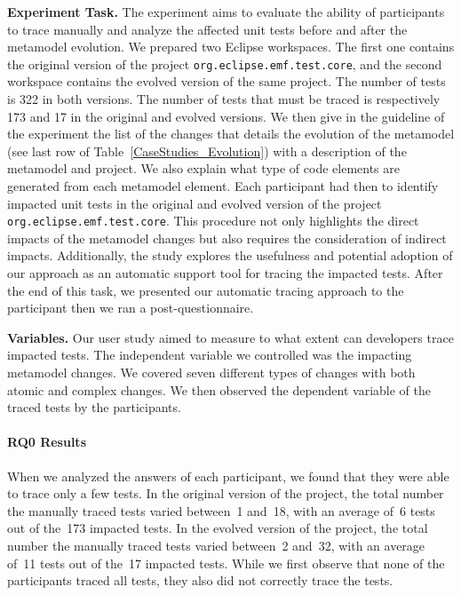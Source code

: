 {\textbf{Experiment Task.} 
The experiment aims to evaluate the ability of participants to trace manually and analyze the affected unit tests before and after the metamodel evolution.
We prepared two Eclipse workspaces. The first one contains the original version of the project \texttt{org.eclipse.emf.test.core}, and the second workspace contains the evolved version of the same project. 
The number of tests is 322 in both versions. The number of tests that must be traced is respectively 173 and 17 in the original and evolved versions. 
We then give in the guideline of the experiment the list of the changes that details the evolution of the metamodel (see last row of Table~\ref{CaseStudies_Evolution}) with a description of the metamodel and project. We also explain what type of code elements are generated from each metamodel element.
Each participant had then to identify impacted unit tests in the original and evolved version of the project \texttt{org.eclipse.emf.test.core}. This procedure not only highlights the direct impacts of the metamodel changes but also requires the consideration of indirect impacts. Additionally, the study explores the usefulness and potential adoption of our approach as an automatic support tool for tracing the impacted tests. 
After the end of this task, we presented our automatic tracing approach to the participant then we ran a post-questionnaire.

\textbf{Variables.} Our user study aimed to measure to what extent can developers trace impacted tests. The independent variable we controlled was the impacting metamodel changes. We covered seven different types of changes with both atomic and complex changes. 
We then observed the dependent variable of the traced tests by the participants. 

\paragraph{RQ0 Results}
When we analyzed the answers of each participant, we found that they were able to trace only a few tests. In the original version of the project, the total number the manually traced tests varied between~1 and~18, with an average of~6 tests out of the~173 impacted tests.   
In the evolved version of the project, the total number the manually traced tests varied between~2 and~32, with an average of~11 tests out of the~17 impacted tests.   
While we first observe that none of the participants traced all tests, they also did not correctly trace the tests. 

}
